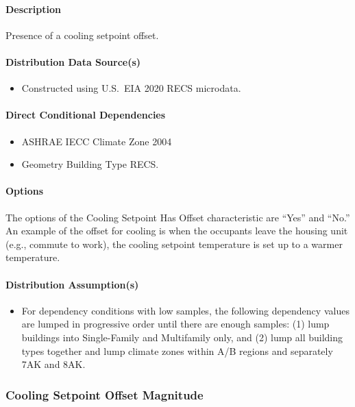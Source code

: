 \paragraph{Description}
Presence of a cooling setpoint offset.

\paragraph{Distribution Data Source(s)}
\begin{itemize}
    \item Constructed using U.S.~EIA 2020 RECS microdata.
\end{itemize}

\paragraph{Direct Conditional Dependencies}
\begin{itemize}
    \item ASHRAE IECC Climate Zone 2004
    \item Geometry Building Type RECS.
\end{itemize}

\paragraph{Options}
The options of the Cooling Setpoint Has Offset characteristic are ``Yes'' and ``No.'' An example of the offset for cooling is when the occupants leave the housing unit (e.g., commute to work), the cooling setpoint temperature is set up to a warmer temperature.

\paragraph{Distribution Assumption(s)}
\begin{itemize}
    \item For dependency conditions with low samples, the following dependency values are lumped in progressive order until there are enough samples: (1) lump buildings into Single-Family and Multifamily only, and (2) lump all building types together and lump climate zones within A/B regions and separately 7AK and 8AK.
\end{itemize}

\subsubsection{Cooling Setpoint Offset Magnitude}
